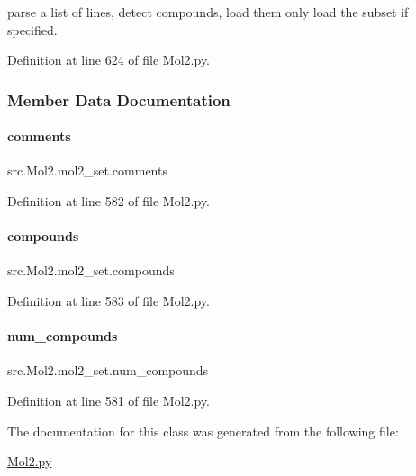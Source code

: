 parse a list of lines, detect compounds, load them only load the subset if specified. 



Definition at line 624 of file Mol2.\+py.



\subsubsection{Member Data Documentation}
\mbox{\label{classsrc_1_1Mol2_1_1mol2__set_a738966bae75c6d835324bdcc6e0b503f}} 
\paragraph{\texorpdfstring{comments}{comments}}
{\footnotesize\ttfamily src.\+Mol2.\+mol2\+\_\+set.\+comments}



Definition at line 582 of file Mol2.\+py.

\mbox{\label{classsrc_1_1Mol2_1_1mol2__set_abe7f696716f52fafdbefe5cb8ef7ecfe}} 
\paragraph{\texorpdfstring{compounds}{compounds}}
{\footnotesize\ttfamily src.\+Mol2.\+mol2\+\_\+set.\+compounds}



Definition at line 583 of file Mol2.\+py.

\mbox{\label{classsrc_1_1Mol2_1_1mol2__set_a5e0f5dcab5439777f02835e30073c3d6}} 
\paragraph{\texorpdfstring{num\+\_\+compounds}{num\_compounds}}
{\footnotesize\ttfamily src.\+Mol2.\+mol2\+\_\+set.\+num\+\_\+compounds}



Definition at line 581 of file Mol2.\+py.



The documentation for this class was generated from the following file\+:\begin{DoxyCompactItemize}
\item 
\hyperlink{Mol2_8py}{Mol2.\+py}\end{DoxyCompactItemize}
